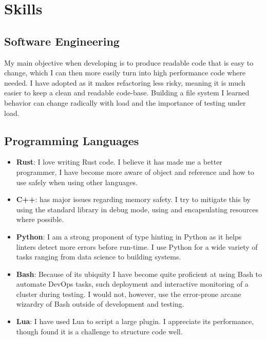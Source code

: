 \section{Skills}
\subsection{Software Engineering}
My main objective when developing is to produce readable code that is easy to change, which I can then more easily turn into high performance code where needed. I have adopted  as it makes refactoring less risky, meaning it is much easier to keep a clean and readable code-base. Building a  file system I learned behavior can change radically with load and the importance of testing under load.

\subsection{Programming Languages}
\begin{itemize}
	\item \textbf{Rust}: I love writing Rust code. I believe it has made me a better programmer, I have become more aware of object and reference  and how to use  safely when using other languages. 
	\item \textbf{C++}: has major issues regarding memory safety. I try to mitigate this by using the standard library in debug mode, using  and encapsulating resources where possible. 
	\item \textbf{Python}: I am a strong proponent of type hinting in Python as it helps linters detect more errors before run-time. I use Python for a wide variety of tasks ranging from data science to building  systems.
	\item \textbf{Bash}: Because of its ubiquity I have become quite proficient at using Bash to automate DevOps tasks, such deployment and interactive monitoring of a cluster during testing. I would not, however, use the error-prone arcane wizardry of Bash outside of development and testing.
	\item \textbf{Lua}: I have used Lua to script a large  plugin. I appreciate its performance, though found it is a challenge to structure code well.
\end{itemize}


